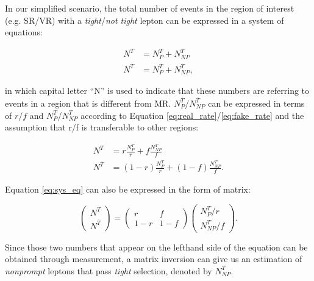 In our simplified scenario, the total number of events in the region of interest (e.g. \ac{SR}/\ac{VR}) with a \emph{tight}/\emph{not tight} lepton can be expressed in a system of equations:

\begin{equation}
\begin{split}
N^{T}&=N_{P}^{T}+N_{NP}^{T}\\
N^{\overline{T}}&=N_{P}^{\overline{T}}+N_{NP}^{\overline{T}},
\end{split}
\end{equation}

in which capital letter ``N'' is used to indicate that these numbers are referring to events in a region that is different from \ac{MR}. $N_{P}^{\overline{T}}$/$N_{NP}^{\overline{T}}$ can be expressed in terms of $r/f$ and $N_{P}^{T}$/$N_{NP}^{T}$ according to Equation \ref{eq:real_rate}/\ref{eq:fake_rate} and the assumption that r/f is transferable to other regions:

\begin{equation}
\begin{split}
N^{T}&=r\frac{N_{P}^{T}}{r}+f\frac{N_{NP}^{T}}{f}\\
N^{\overline{T}}&=(1-r)\frac{N_{P}^{T}}{r}+(1-f)\frac{N_{NP}^{T}}{f}.
\end{split}
\label{eq:sys_eq}
\end{equation}

Equation \ref{eq:sys_eq} can also be expressed in the form of matrix:

\begin{equation}
 \begin{pmatrix}
 N^{T}\\
 N^{\overline{T}}
 \end{pmatrix}=\begin{pmatrix}
r&f\\
1-r&1-f
 \end{pmatrix}\begin{pmatrix}
 N_{P}^{T}/r\\
 N_{NP}^{T}/f
 \end{pmatrix}.
 \label{eq:matrix}
 \end{equation}
 
Since those two numbers that appear on the lefthand side of the equation can be obtained through measurement, a matrix inversion can give us an estimation of \emph{nonprompt} leptons that pass \emph{tight} selection, denoted by $N_{NP}^T$.
